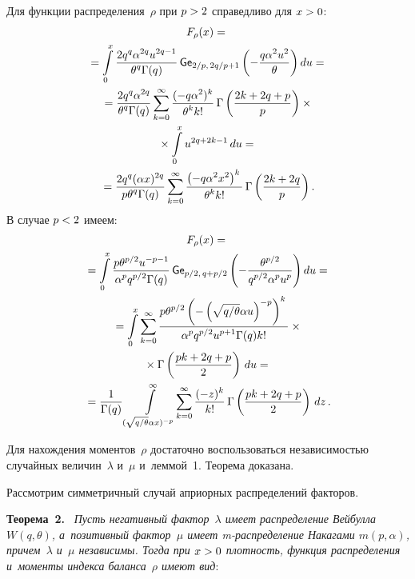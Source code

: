 \begin{multicols}{2}
Для функции распределения~$\rho$ при $p\hm>2$ справедливо для $x\hm>0$:
\begin{multline*}
F_\rho(x) = {}\\
{}=\int\limits_{0}^{x} \displaystyle\frac{\displaystyle 2 q^q \alpha^{2q} u^{2q-1}\mathstrut}{\displaystyle {\theta^q 
\Gamma(q)}\mathstrut}\,{\sf Ge}_{2/p,\, 2q/p+1} \left(-\displaystyle\frac{\displaystyle q\alpha^2 u^2\mathstrut}{\displaystyle \theta\mathstrut}\right) du 
={}\\
{}= \displaystyle\frac{\displaystyle 2 q^q \alpha^{2q}\mathstrut}{\displaystyle { \theta^q \Gamma(q)}\mathstrut} \sum\limits_{k=0}^\infty 
\displaystyle\frac{\displaystyle (- q \alpha^2 )^k\mathstrut}{\displaystyle {\theta^kk!}\mathstrut} \,\Gamma\left(\displaystyle\frac{\displaystyle 2k + 2q + p\mathstrut}{\displaystyle p\mathstrut}\right)\times{}\\
{}\times  
\int\limits_{0}^{x}u^{2q+2k-1}\,du ={}\\
{}= \displaystyle\frac{\displaystyle 2 q^q(\alpha x)^{2q}\mathstrut}{\displaystyle {p\theta^q \Gamma(q)}\mathstrut}\sum\limits_{k=0}^\infty 
\displaystyle\frac{\displaystyle \left(- q \alpha^2 x^2\right)^k\mathstrut}{\displaystyle {\theta^kk!}\mathstrut}\,\Gamma\left(\displaystyle\frac{\displaystyle 2k + 2q\mathstrut}{\displaystyle p\mathstrut}\right).
\end{multline*}
В случае $p\hm<2$ имеем:
\begin{multline*}
F_\rho(x) = {}\\
{}=\int\limits_{0}^{x}
\displaystyle\frac{\displaystyle p \theta^{p/2}u^{-p-1}\mathstrut}{\displaystyle {\alpha^p q^{p/2}  
\Gamma(q)}\mathstrut}\,{\sf Ge}_{p/2,\, q+p/2} \left(-
\displaystyle\frac{\displaystyle \theta^{p/2}\mathstrut}{\displaystyle q^{p/2}\alpha^pu^p\mathstrut}\right)du={}\\
{} = \int\limits_{0}^{x} \sum\limits_{k=0}^\infty 
\displaystyle\frac{\displaystyle p \theta^{p/2} 
\left(-\left(\sqrt{q/\theta} \alpha u \right)^{-p}\right)^k\mathstrut}{\displaystyle {\alpha^p q^{p/2} u^{p+1}
 \Gamma(q) 
k!}\mathstrut} \times{}\\
{}\times
\Gamma\left(\frac{pk + 2q + p}{2}\right)  \, du={}\\
{}= \displaystyle\frac{\displaystyle 1\mathstrut}{\displaystyle {\Gamma(q)}\mathstrut}\int\limits_{(\sqrt{q/\theta} \alpha x)^{-p}}^{\infty}  
\!\sum\limits_{k=0}^\infty \displaystyle\frac{\displaystyle (-z)^k \mathstrut}{\displaystyle {k!}\mathstrut} \,\Gamma\left(\displaystyle\frac{\displaystyle pk + 2q + 
p\mathstrut}{\displaystyle 2\mathstrut}\right) \,dz\,.
\end{multline*}

Для нахождения моментов~$\rho$ достаточно воспользоваться независимостью 
случайных величин~$\lambda$ и~$\mu$ и~леммой~1.
Теорема доказана.

\smallskip

Рассмотрим симметричный случай априорных распределений факторов.

\smallskip

\noindent
\textbf{Теорема~2.}\
\textit{Пусть негативный фактор~$\lambda$ имеет распределение Вейбулла $W(q,\theta)$, 
а~позитивный фактор~$\mu$ имеет m-рас\-пре\-де\-ле\-ние Накагами $m(p, \alpha)$, 
причем~$\lambda$ и~$\mu$ независимы. Тогда при $x\hm>0$ 
плотность, функция распределения и~моменты индекса баланса~$\rho$ имеют вид}:


\end{multicols}
